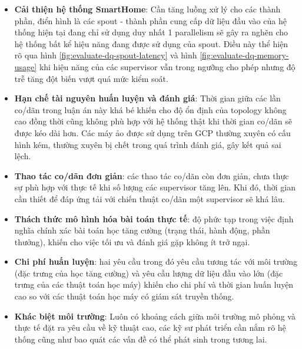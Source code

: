 \begin{itemize}
    \item \textbf{Cải thiện hệ thống SmartHome}: Cần tăng luồng xử lý cho các thành phần, điển hình là các spout - thành phần cung cấp dữ liệu đầu vào của hệ thống hiện tại đang chỉ sử dụng duy nhất 1 parallelism sẽ gây ra nghẽn cho hệ thống bất kể hiệu năng đang được sử dụng của spout. Điều này thể hiện rõ qua hình \ref{fig:evaluate-dq-spout-latency} và hình \ref{fig:evaluate-dq-memory-usage} khi hiệu năng của các supervisor vẫn trong ngưỡng cho phép nhưng độ trễ tăng đột biến vượt quá mức kiểm soát.
    \item \textbf{Hạn chế tài nguyên huấn luyện và đánh giá}: Thời gian giữa các lần co/dãn trong luận án này khá bé khiến cho độ ổn định của topology không cao đồng thời cũng không phù hợp với hệ thống thật khi thời gian co/dãn sẽ được kéo dài hơn. Các máy ảo được sử dụng trên GCP thường xuyên có cấu hình kém, thường xuyên bị chết trong quá trình đánh giá, gây kết quả sai lệch.
    \item \textbf{Thao tác co/dãn đơn giản}: các thao tác co/dãn còn đơn giản, chưa thực sự phù hợp với thực tế khi số lượng các supervisor tăng lên. Khi đó, thời gian cần thiết để đáp ứng tải với chiến thuật co/dãn một supervisor sẽ khá lâu.
    \item \textbf{Thách thức mô hình hóa bài toán thực tế}: độ phức tạp trong việc định nghĩa chính xác bài toán học tăng cường (trạng thái, hành động, phần thưởng), khiến cho việc tối ưu và đánh giá gặp không ít trở ngại.
    \item \textbf{Chi phí huấn luyện}: hai yêu cầu trong đó yêu cầu tương tác với môi trường (đặc trưng của học tăng cường) và yêu cầu lượng dữ liệu đầu vào lớn (đặc trưng của các thuật toán học máy) khiến cho chi phí và thời gian huấn luyện cao so với các thuật toán học máy có giám sát truyền thống.
    \item \textbf{Khác biệt môi trường}: Luôn có khoảng cách giữa môi trường mô phỏng và thực tế đặt ra yêu cầu về kỹ thuật cao, các kỹ sư phát triển cần nắm rõ hệ thống cũng như bao quát các vấn đề có thể phát sinh trong tương lai.
\end{itemize}